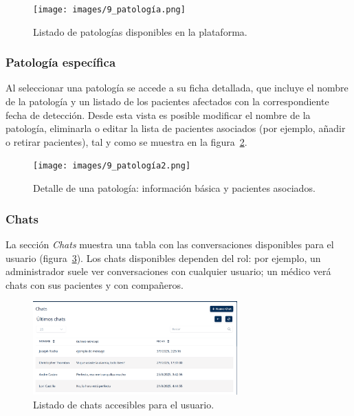 \documentclass[12pt, a4paper]{article}
\begin{document}
\begin{umaappendices}
\vspace{-5pt}

\begin{figure}[htbp]
	\centering
	\texttt{[image: images/9\_patología.png]}
	\caption[Ejemplo]{Listado de patologías disponibles en la plataforma.}
	\label{fig:patol}
\end{figure}

\vspace{-20pt}

\subsubsection{Patología específica}
Al seleccionar una patología se accede a su ficha detallada, que incluye el nombre de la patología y un listado de los pacientes afectados con la correspondiente fecha de detección. Desde esta vista es posible modificar el nombre de la patología, eliminarla o editar la lista de pacientes asociados (por ejemplo, añadir o retirar pacientes), tal y como se muestra en la figura~\ref{fig:patolo}.

\vspace{-5pt}

\begin{figure}[htbp]
	\centering
	\texttt{[image: images/9\_patología2.png]}
	\caption[Ejemplo]{Detalle de una patología: información básica y pacientes asociados.}
	\label{fig:patolo}
\end{figure}

\subsubsection{Chats}
			\label{sec:chat}
La sección \textit{Chats} muestra una tabla con las conversaciones disponibles para el usuario (figura~\ref{fig:chat1}). Los chats disponibles dependen del rol: por ejemplo, un administrador suele ver conversaciones con cualquier usuario; un médico verá chats con sus pacientes y con compañeros.
\vspace{-5pt}

\begin{figure}[htbp]
	\centering
	\includegraphics[width=0.7\textwidth]{images/10_chat.png}
	\caption[Ejemplo]{Listado de chats accesibles para el usuario.}
	\label{fig:chat1}
\end{figure}
\vspace{-15pt}


\end{umaappendices}
\end{document}
